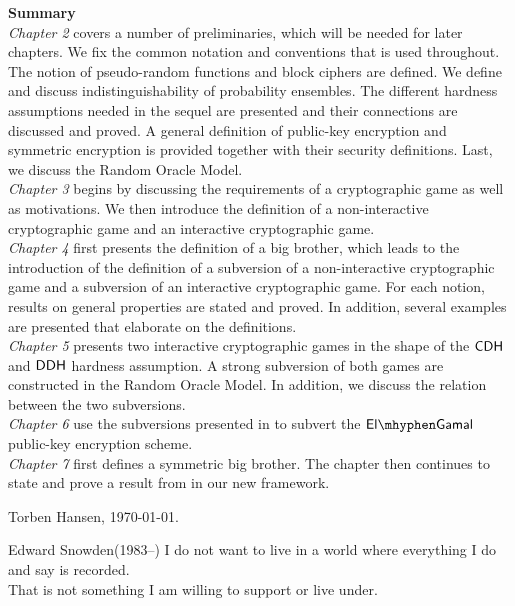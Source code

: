 \noindent\textbf{Summary}\\

\noindent\emph{Chapter 2} covers a number of preliminaries, which will be needed for later chapters. We fix the common notation and conventions that is used throughout. The notion of pseudo-random functions and block ciphers are defined. We define and discuss indistinguishability of probability ensembles. The different hardness assumptions needed in the sequel are presented and their connections are discussed and proved. A general definition of public-key encryption and symmetric encryption is provided together with their security definitions. Last, we discuss the Random Oracle Model.  \\

\noindent\emph{Chapter 3} begins by discussing the requirements of a cryptographic game as well as motivations. We then introduce the definition of a non-interactive cryptographic game and an interactive cryptographic game.\\

\noindent\emph{Chapter 4} first presents the definition of a big brother, which leads to the introduction of the definition of a subversion of a non-interactive cryptographic game and a subversion of an interactive cryptographic game. For each notion, results on general properties are stated and proved. In addition, several examples are presented that elaborate on the definitions. \\

\noindent\emph{Chapter 5} presents two interactive cryptographic games in the shape of the $\mathsf{CDH}$ and $\mathsf{DDH}$ hardness assumption. A strong subversion of both games are constructed in the Random Oracle Model. In addition, we discuss the relation between the two subversions. \\

\noindent\emph{Chapter 6} use the subversions presented in  to subvert the $\elGamal$ public-key encryption scheme. \\

\noindent\emph{Chapter 7} first defines a symmetric big brother. The chapter then continues to state and prove a result from \cite{DBLP:secSym} in our new framework.  

\begin{flushright}
Torben Hansen, \today.
\end{flushright}

\newpage
\vphantom{bla}
\vfill
\begin{citat}{Edward Snowden(1983--) 
}
I do not want to live in a world where everything I do and say is recorded. \\That is
not something I am willing to support or live under.  
\end{citat}



